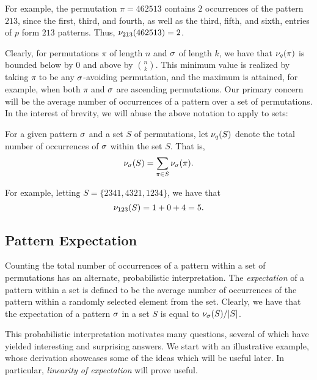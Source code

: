   For example, the permutation $\pi = 462513$ contains $2$ occurrences of the
  pattern $213$, since the first, third, and fourth, as well as the third,
  fifth, and sixth, entries of $p$ form $213$ patterns. Thus,
  $\nu_{213}(462513) = 2$.  

  

  Clearly, for permutations $\pi$ of length $n$ and $\sigma$ of length $k$, we have
  that $\nu_q(\pi)$ is bounded below by $0$ and above by $\binom{n}{k}$. This
  minimum value is realized by taking $\pi$ to be any $\sigma$-avoiding
  permutation, and the maximum is attained, for example, when both $\pi$ and
  $\sigma$ are ascending permutations.  Our primary concern will be the average
  number of occurrences of a pattern over a set of permutations. In the interest
  of brevity, we will abuse the above notation to apply to sets:
  
  \begin{definition} \label{def:set-occurrence} For a given pattern $\sigma$ and a
  set $S$ of permutations, let $\nu_q(S)$ denote the total number of
  occurrences of $\sigma$ within the set $S$. That is, $$ \nu_\sigma(S) = \sum_{\pi
  \in S} \nu_\sigma(\pi).$$ \end{definition}
  
  For example, letting $S = \{2341, 4321, 1234\}$, we have that 
  $$ \nu_{123}(S) = 1 + 0 + 4 = 5.$$ 


  \subsection{Pattern Expectation}
      
    Counting the total number of occurrences of a pattern within a set of
    permutations has an alternate, probabilistic interpretation. The
    \emph{expectation}  of a pattern within a set is defined
    to be the average number of occurrences of the pattern within a randomly
    selected element from the set. Clearly, we have that the expectation of a
    pattern $\sigma$ in a set $S$ is equal to $\nu_\sigma(S) / |S|$. 
    
    This probabilistic interpretation motivates many questions, several of which
    have yielded interesting and surprising answers. We start with an
    illustrative example, whose derivation showcases some of the ideas which
    will be useful later. In particular, \emph{linearity of expectation}
     will prove useful. 
    
